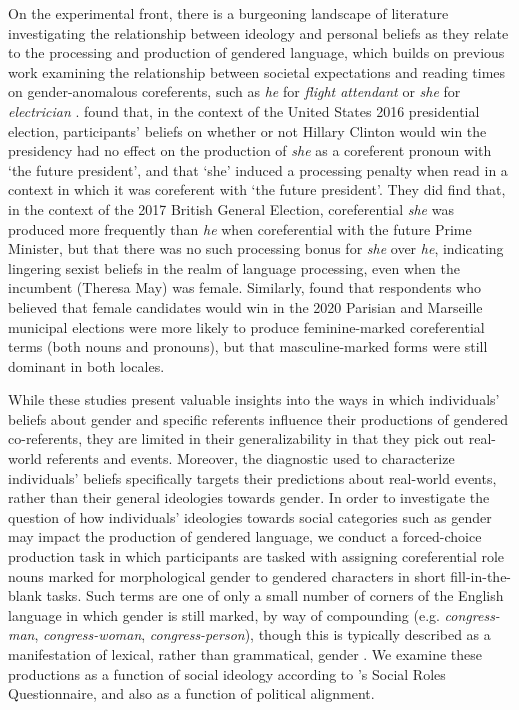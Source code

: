 \documentclass[10pt,letterpaper]{article}
\begin{document}
	On the experimental front, there is a burgeoning landscape of literature investigating the relationship between ideology and personal beliefs as they relate to the processing and production of gendered language, which builds on previous work examining the relationship between societal expectations and reading times on gender-anomalous coreferents, such as \textit{he} for \textit{flight attendant} or \textit{she} for \textit{electrician} \parencite{foertsch1997search,duffy2004violating}. \textcite{von2020implicit} found that, in the context of the United States 2016 presidential election, participants' beliefs on whether or not Hillary Clinton would win the presidency had no effect on the production of \textit{she} as a coreferent pronoun with `the future president', and that `she' induced a processing penalty when read in a context in which it was coreferent with `the future president'. They did find that, in the context of the 2017 British General Election, coreferential \textit{she} was produced more frequently than \textit{he} when coreferential with the future Prime Minister, but that there was no such processing bonus for \textit{she} over \textit{he}, indicating lingering sexist beliefs in the realm of language processing, even when the incumbent (Theresa May) was female. Similarly, \textcite{pozniak2021failures} found that respondents who believed that female candidates would win in the 2020 Parisian and Marseille municipal elections were more likely to produce feminine-marked coreferential terms (both nouns and pronouns), but that masculine-marked forms were still dominant in both locales. \par 
	While these studies present valuable insights into the ways in which individuals' beliefs about gender and specific referents influence their productions of gendered co-referents, they are limited in their generalizability in that they pick out real-world referents and events. Moreover, the diagnostic used to characterize individuals' beliefs specifically targets their predictions about real-world events, rather than their general ideologies towards gender. In order to investigate the question of how individuals' ideologies towards social categories such as gender may impact the production of gendered language, we conduct a forced-choice production task in which participants are tasked with assigning coreferential role nouns \parencite{misersky2014norms} marked for morphological gender to gendered characters in short fill-in-the-blank tasks. Such terms are one of only a small number of corners of the English language in which gender is still marked, by way of compounding (e.g. \textit{congress-man}, \textit{congress-woman}, \textit{congress-person}), though this is typically described as a manifestation of lexical, rather than grammatical, gender \parencite{kastovsky2011inflectional,hellinger2001english}. We examine these productions as a function of social ideology according to \textcite{baber2006social}'s Social Roles Questionnaire, and also as a function of political alignment. \par
	
\end{document}
